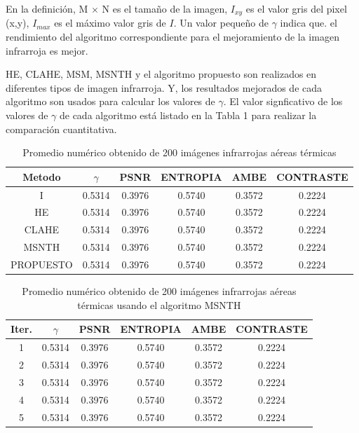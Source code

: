 \documentclass[a4paper, 11 pt, conference]{ieeeconf}      %
\begin{document}
En la definici\'on, M $\times$ N es el tamaño de la imagen, $I_{xy}$ es el valor gris del pixel (x,y), $I_{max}$ es el m\'aximo valor gris de $I$. Un valor pequeño de $\gamma$ indica que. el rendimiento del algoritmo correspondiente para el mejoramiento de la imagen infrarroja es mejor.

HE, CLAHE, MSM, MSNTH y el algoritmo propuesto son realizados en diferentes tipos de imagen infrarroja. Y, los resultados mejorados de cada algoritmo son usados para calcular los valores de  $\gamma$. El valor signficativo de los valores de $\gamma$ de cada algoritmo est\'a listado en la Tabla 1 para realizar la comparaci\'on cuantitativa.

\begin{table}[h]
\centering
\tiny
\caption{Promedio num\'erico obtenido de 200 im\'agenes infrarrojas a\'ereas t\'ermicas}
\label{tabla_1}
\begin{center}
\begin{tabular}{ c c c c c c }
\hline
\textbf{Metodo} & \textbf{$\gamma$} & \textbf{PSNR} & \textbf{ENTROPIA} & \textbf{AMBE} & \textbf{CONTRASTE} \\
\hline
I & 0.5314 & 0.3976 & 0.5740 & 0.3572 & 0.2224 \\
HE & 0.5314 & 0.3976 & 0.5740 & 0.3572 & 0.2224 \\
CLAHE & 0.5314 & 0.3976 & 0.5740 & 0.3572 & 0.2224 \\
MSNTH & 0.5314 & 0.3976 & 0.5740 & 0.3572 & 0.2224 \\
PROPUESTO & 0.5314 & 0.3976 & 0.5740 & 0.3572 & 0.2224 \\
\hline
\end{tabular}
\end{center}
\end{table}
\normalsize

\begin{table}[h]
\centering
\tiny
\caption{Promedio num\'erico obtenido de 200 im\'agenes infrarrojas a\'ereas t\'ermicas usando el algoritmo MSNTH}
\label{tabla_2}
\begin{center}
\begin{tabular}{ c c c c c c }
\hline
\textbf{Iter.} & \textbf{$\gamma$} & \textbf{PSNR} & \textbf{ENTROPIA} & \textbf{AMBE} & \textbf{CONTRASTE} \\
\hline
1 & 0.5314 & 0.3976 & 0.5740 & 0.3572 & 0.2224 \\
2 & 0.5314 & 0.3976 & 0.5740 & 0.3572 & 0.2224 \\
3 & 0.5314 & 0.3976 & 0.5740 & 0.3572 & 0.2224 \\
4 & 0.5314 & 0.3976 & 0.5740 & 0.3572 & 0.2224 \\
5 & 0.5314 & 0.3976 & 0.5740 & 0.3572 & 0.2224 \\
\hline
\end{tabular}
\end{center}
\end{table}
\normalsize
\end{document}
